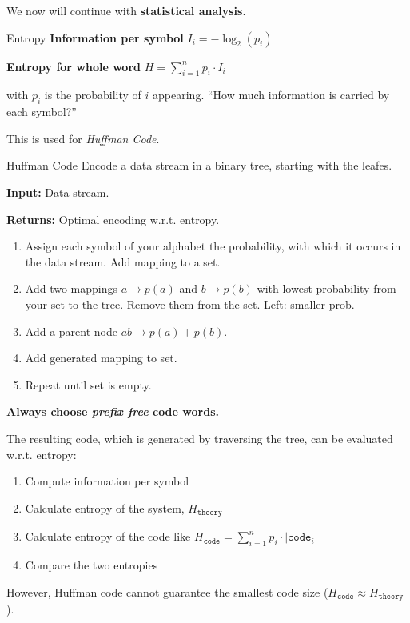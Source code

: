 \documentclass[english]{panikzettel}
\newcommand{\alert}[1]{\textbf{\textcolor{red!75!black}{#1}}}
\begin{document}
	We now will continue with \textbf{statistical analysis}.

	\begin{defi}{Entropy}
		\textbf{Information per symbol}
		\( I_i = -\log_{2}(p_i) \)

		\textbf{Entropy for whole word}
		\( H = \sum_{i=1}^n p_i \cdot I_i \)

		with \( p_i \) is the probability of \( i \) appearing.
		\tcblower
		\enquote{How much information is carried by each symbol?}
	\end{defi}

	This is used for \textit{Huffman Code}.

	\begin{algo}{Huffman Code}
		Encode a data stream in a binary tree, starting with the leafes.

		\textbf{Input:} Data stream.

		\textbf{Returns:} Optimal encoding w.r.t. entropy.
		\tcblower
		\begin{enumerate}
			\item Assign each symbol of your alphabet the probability, with which it occurs in the data stream. Add mapping to a set.
			\item Add two mappings \( a \rightarrow p(a) \) and \( b \rightarrow p(b) \) with lowest probability from your set to the tree. Remove them from the set. Left: smaller prob.
			\item Add a parent node \( ab \rightarrow p(a)+p(b) \).
			\item Add generated mapping to set.
			\item Repeat until set is empty.
		\end{enumerate}
		\alert{Always choose \textit{prefix free} code words.}
	\end{algo}

	The resulting code, which is generated by traversing the tree, can be evaluated w.r.t. entropy: 
	\begin{enumerate}
		\item Compute information per symbol
		\item Calculate entropy of the system, \( H_\texttt{theory} \)
		\item Calculate entropy of the code like \(H_\texttt{code} = \sum_{i=1}^n p_i \cdot |\texttt{code}_i| \) 
		\item Compare the two entropies
	\end{enumerate}
	
	However, Huffman code cannot guarantee the smallest code size (\( H_\texttt{code} \approx H_ \texttt{theory} \)).
\end{document}
